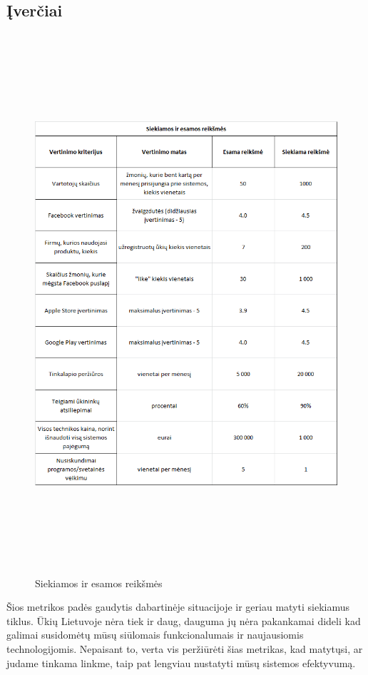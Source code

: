 \documentclass[oneside]{VUMIFPSkursinis}
\begin{document}
\subsection{Įverčiai}
\begin{figure}[H]
		\centering	
	\includegraphics[width=18cm,height=20cm,keepaspectratio]{iverciai.png}
	\caption{Siekiamos ir esamos reikšmės}
	\label{fig:Iverciai}
\end{figure}
Šios metrikos padės gaudytis dabartinėje situacijoje ir geriau matyti siekiamus tiklus. Ūkių Lietuvoje nėra tiek ir daug, dauguma jų nėra pakankamai dideli kad galimai susidomėtų mūsų siūlomais funkcionalumais ir naujausiomis technologijomis. Nepaisant to, verta vis peržiūrėti šias metrikas, kad matytųsi, ar judame tinkama linkme, taip pat lengviau nustatyti mūsų sistemos efektyvumą. 
\end{document}
